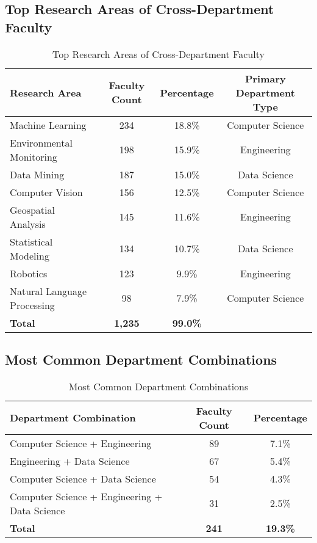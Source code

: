 \documentclass[12pt]{article}
\begin{document}
\subsection{Top Research Areas of Cross-Department Faculty}

\begin{table}[h]
\centering
\caption{Top Research Areas of Cross-Department Faculty}
\label{tab:research_areas}
\begin{tabular}{lccc}
\toprule
\textbf{Research Area} & \textbf{Faculty Count} & \textbf{Percentage} & \textbf{Primary Department Type} \\
\midrule
Machine Learning & 234 & 18.8\% & Computer Science \\
Environmental Monitoring & 198 & 15.9\% & Engineering \\
Data Mining & 187 & 15.0\% & Data Science \\
Computer Vision & 156 & 12.5\% & Computer Science \\
Geospatial Analysis & 145 & 11.6\% & Engineering \\
Statistical Modeling & 134 & 10.7\% & Data Science \\
Robotics & 123 & 9.9\% & Engineering \\
Natural Language Processing & 98 & 7.9\% & Computer Science \\
\midrule
\textbf{Total} & \textbf{1,235} & \textbf{99.0\%} & \\
\bottomrule
\end{tabular}
\end{table}

\subsection{Most Common Department Combinations}

\begin{table}[h]
\centering
\caption{Most Common Department Combinations}
\label{tab:department_combinations}
\begin{tabular}{lcc}
\toprule
\textbf{Department Combination} & \textbf{Faculty Count} & \textbf{Percentage} \\
\midrule
Computer Science + Engineering & 89 & 7.1\% \\
Engineering + Data Science & 67 & 5.4\% \\
Computer Science + Data Science & 54 & 4.3\% \\
Computer Science + Engineering + Data Science & 31 & 2.5\% \\
\midrule
\textbf{Total} & \textbf{241} & \textbf{19.3\%} \\
\bottomrule
\end{tabular}
\end{table}
\end{document}
